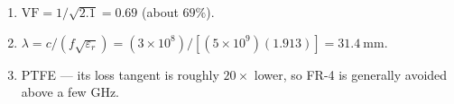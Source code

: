 \begin{enumerate}[leftmargin=1.6em,itemsep=2pt]
\item $\mathrm{VF} = 1/\sqrt{2.1} = 0.69$ (about $69\%$).
\item $\lambda = c/(f\sqrt{\varepsilon_r}) = (3\times10^{8})/[(5\times10^{9})(1.913)] = 31.4\ \mathrm{mm}$.
\item PTFE --- its loss tangent is roughly $20\times$ lower, so FR-4 is generally avoided above a few GHz.
\end{enumerate}
